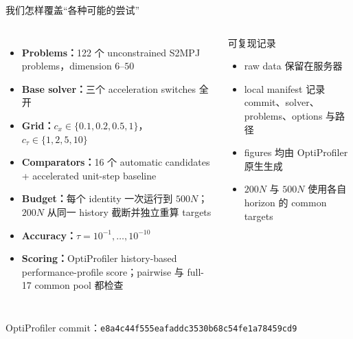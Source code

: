 \documentclass[aspectratio=169,10pt]{beamer}
\newcommand{\tight}{\setlength{\itemsep}{0.35em}\setlength{\parskip}{0pt}}
\begin{document}
\begin{frame}{我们怎样覆盖“各种可能的尝试”}
\small
\begin{columns}[T,onlytextwidth]
\begin{itemize}\tight
  \item \textbf{Problems：}122 个 unconstrained S2MPJ problems，dimension $6$--$50$
  \item \textbf{Base solver：}三个 acceleration switches 全开
  \item \textbf{Grid：}$c_x\in\{0.1,0.2,0.5,1\}$，$c_\tau\in\{1,2,5,10\}$
  \item \textbf{Comparators：}16 个 automatic candidates + accelerated unit-step baseline
  \item \textbf{Budget：}每个 identity 一次运行到 $500N$；$200N$ 从同一 history 截断并独立重算 targets
  \item \textbf{Accuracy：}$\tau=10^{-1},\ldots,10^{-10}$
  \item \textbf{Scoring：}OptiProfiler history-based performance-profile score；pairwise 与 full-17 common pool 都检查
\end{itemize}

\begin{block}{可复现记录}
\begin{itemize}\tight
  \item raw data 保留在服务器
  \item local manifest 记录 commit、solver、problems、options 与路径
  \item figures 均由 OptiProfiler 原生生成
  \item $200N$ 与 $500N$ 使用各自 horizon 的 common targets
\end{itemize}
\end{block}
\end{columns}

\vfill
\centering\footnotesize
OptiProfiler commit：\texttt{e8a4c44f555eafaddc3530b68c54fe1a78459cd9}
\end{frame}
\end{document}
